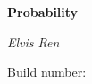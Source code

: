 




\begin{titlepage}
    \centering
    \vspace*{5cm}
    {\Huge\bfseries Probability\par}
    \vspace*{0.5cm}
    {\Large\itshape Elvis Ren\par}
    \vspace{0.5cm}
    {\Large Build number: \buildnumber\par}
    \vspace{0.5cm}
    {\large \DTMnow\par}
\end{titlepage}


\tableofcontents






